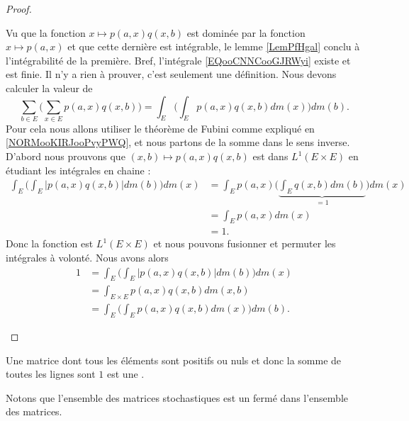 \begin{proof}
\begin{subproof}
		Vu que la fonction \( x\mapsto p(a,x)q(x,b)\) est dominée par la fonction \( x\mapsto p(a,x)\) et que cette dernière est intégrable, le lemme \ref{LemPfHgal} conclu à l'intégrabilité de la première. Bref, l'intégrale \eqref{EQooCNNCooGJRWyi} existe et est finie.
		Il n'y a rien à prouver, c'est seulement une définition.
		Nous devons calculer la valeur de
		\begin{equation}
			\sum_{b\in E}\big( \sum_{x\in E}p(a,x)q(x,b) \big)=\int_E\big( \int_Ep(a,x)q(x,b)dm(x) \big)dm(b).
		\end{equation}
		Pour cela nous allons utiliser le théorème de Fubini comme expliqué en \ref{NORMooKIRJooPvyPWQ}, et nous partons de la somme dans le sens inverse. D'abord nous prouvons que \( (x,b)\mapsto p(a,x)q(x,b)\) est dans \( L^1(E\times E)\) en étudiant les intégrales en chaine :
		\begin{subequations}
			\begin{align}
				\int_E\Big( \int_E| p(a,x)q(x,b) |dm(b) \Big)dm(x) & =\int_E p(a,x)\Big( \underbrace{\int_Eq(x,b)dm(b)}_{=1} \Big)dm(x) \\
				                                                   & =\int_Ep(a,x)dm(x)                                                 \\
				                                                   & =1.
			\end{align}
		\end{subequations}
		Donc la fonction est \( L^1(E\times E)\) et nous pouvons fusionner et permuter les intégrales à volonté. Nous avons alors
		\begin{subequations}
			\begin{align}
				1 & =\int_E\Big( \int_E| p(a,x)q(x,b) |dm(b) \Big)dm(x) \\
				  & =\int_{E\times E}p(a,x)q(x,b)dm(x,b)                \\
				  & =\int_E\Big( \int_Ep(a,x)q(x,b)dm(x) \Big)dm(b).
			\end{align}
		\end{subequations}
	\end{subproof}
\end{proof}

\begin{definition}      \label{DefGJEBooZvuIAV}
	Une matrice dont tous les éléments sont positifs ou nuls et donc la somme de toutes les lignes sont \( 1\) est une .
\end{definition}
Notons que l'ensemble des matrices stochastiques est un fermé dans l'ensemble des matrices.

